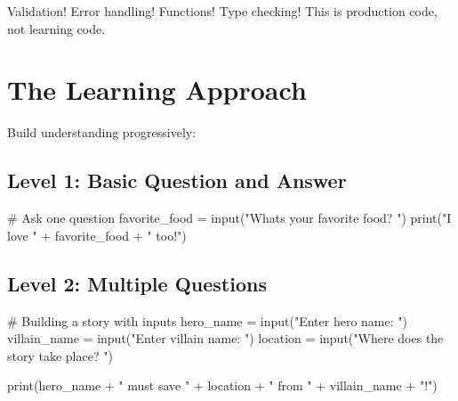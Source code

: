 \documentclass[
  letterpaper,
  DIV=11,
  numbers=noendperiod,
  oneside]{scrreprt}
\newenvironment{Shaded}{}{}
\newcommand{\BuiltInTok}[1]{\textcolor[rgb]{0.84,0.23,0.29}{#1}}
\newcommand{\CommentTok}[1]{\textcolor[rgb]{0.42,0.45,0.49}{#1}}
\newcommand{\NormalTok}[1]{\textcolor[rgb]{0.14,0.16,0.18}{#1}}
\newcommand{\OperatorTok}[1]{\textcolor[rgb]{0.14,0.16,0.18}{#1}}
\newcommand{\StringTok}[1]{\textcolor[rgb]{0.01,0.18,0.38}{#1}}
\begin{document}
Validation! Error handling! Functions! Type checking! This is production
code, not learning code.

\section{The Learning Approach}\label{the-learning-approach-2}

Build understanding progressively:

\subsection{Level 1: Basic Question and
Answer}\label{level-1-basic-question-and-answer}

\begin{Shaded}
\begin{Highlighting}[]
\CommentTok{\# Ask one question}
\NormalTok{favorite\_food }\OperatorTok{=} \BuiltInTok{input}\NormalTok{(}\StringTok{"What\textquotesingle{}s your favorite food? "}\NormalTok{)}
\BuiltInTok{print}\NormalTok{(}\StringTok{"I love "} \OperatorTok{+}\NormalTok{ favorite\_food }\OperatorTok{+} \StringTok{" too!"}\NormalTok{)}
\end{Highlighting}
\end{Shaded}

\subsection{Level 2: Multiple
Questions}\label{level-2-multiple-questions}

\begin{Shaded}
\begin{Highlighting}[]
\CommentTok{\# Building a story with inputs}
\NormalTok{hero\_name }\OperatorTok{=} \BuiltInTok{input}\NormalTok{(}\StringTok{"Enter hero name: "}\NormalTok{)}
\NormalTok{villain\_name }\OperatorTok{=} \BuiltInTok{input}\NormalTok{(}\StringTok{"Enter villain name: "}\NormalTok{)}
\NormalTok{location }\OperatorTok{=} \BuiltInTok{input}\NormalTok{(}\StringTok{"Where does the story take place? "}\NormalTok{)}

\BuiltInTok{print}\NormalTok{(hero\_name }\OperatorTok{+} \StringTok{" must save "} \OperatorTok{+}\NormalTok{ location }\OperatorTok{+} \StringTok{" from "} \OperatorTok{+}\NormalTok{ villain\_name }\OperatorTok{+} \StringTok{"!"}\NormalTok{)}
\end{Highlighting}
\end{Shaded}
\end{document}
